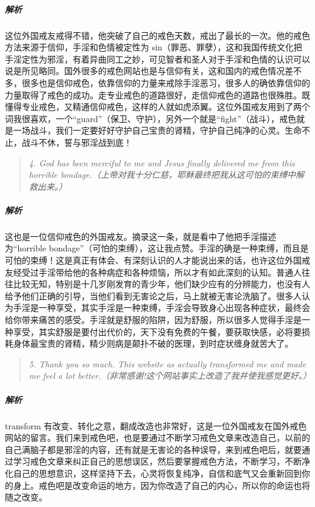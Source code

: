 \subparagraph{解析} 这位外国戒友戒得不错，他突破了自己的戒色天数，戒出了最长的一次。他的戒色方法来源于信仰，手淫和色情被定性为 sin（罪恶、罪孽），这和我国传统文化把手淫定性为邪淫，有着异曲同工之妙，可见智者和圣人对于手淫和色情的认识可以说是所见略同。国外很多的戒色网站也是与信仰有关，这和国内的戒色情况差不多，很多也是信仰戒色，依靠信仰的力量来戒除手淫恶习，很多人的确依靠信仰的力量取得了戒色的成功。走专业戒色的道路很好，走信仰戒色的道路也很殊胜。既懂得专业戒色，又精通信仰戒色，这样的人就如虎添翼。这位外国戒友用到了两个词我很喜欢，一个“guard”（保卫、守护），另外一个就是“fight”（战斗），戒色就是一场战斗，我们一定要好好守护自己宝贵的肾精，守护自己纯净的心灵。生命不止，战斗不休，誓与邪淫战到底！

\begin{quote}\it
    4. God has been merciful to me and Jesus finally delivered me from this horrible bondage.（上帝对我十分仁慈，耶稣最终把我从这可怕的束缚中解救出来。）
\end{quote}

\subparagraph{解析} 这也是一位信仰戒色的外国戒友。摘录这一条，就是看中了他把手淫描述为“horrible bondage”（可怕的束缚），这让我点赞。手淫的确是一种束缚，而且是可怕的束缚！这是真正有体会、有深刻认识的人才能说出来的话，也许这位外国戒友经受过手淫带给他的各种病症和各种烦恼，所以才有如此深刻的认知。普通人往往比较无知，特别是十几岁刚发育的青少年，他们缺少应有的分辨能力，也没有人给予他们正确的引导，当他们看到无害论之后，马上就被无害论洗脑了。很多人认为手淫是一种享受，其实手淫是一种束缚，手淫会导致身心出现各种症状，最终会给你带来痛苦的感受。手淫就是舒服的陷阱，因为舒服，所以很多人觉得手淫是一种享受，其实舒服是要付出代价的，天下没有免费的午餐，要获取快感，必将要损耗身体最宝贵的肾精，精少则病是颠扑不破的医理，到时症状缠身就苦大了。

\begin{quote}\it
    5. Thank you so much. This website as actually transformed me and made me feel a lot better.（非常感谢!这个网站事实上改造了我并使我感觉更好。）
\end{quote}

\subparagraph{解析} transform 有改变、转化之意，翻成改造也非常好，这是一位外国戒友在国外戒色网站的留言。我们来到戒色吧，也是要通过不断学习戒色文章来改造自己，以前的自己满脑子都是邪淫的内容，还有就是无害论的各种误导，来到戒色吧后，就要通过学习戒色文章来纠正自己的思想误区，然后要掌握戒色方法，不断学习，不断净化自己的思想意识，这样坚持下去，心灵将恢复纯净，自信和底气又会重新回到你的身上。戒色吧是改变命运的地方，因为你改造了自己的内心，所以你的命运也将随之改变。

